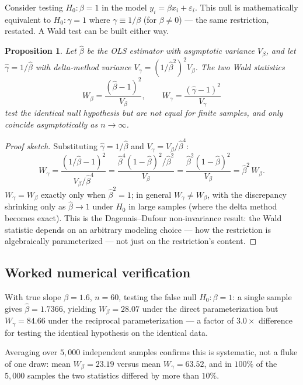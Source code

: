 \documentclass[10pt,journal,compsoc]{IEEEtran}
\newtheorem{proposition}{Proposition}
\begin{document}
Consider testing $H_0:\beta=1$ in the model $y_i=\beta x_i+\varepsilon_i$. This null is mathematically equivalent to $H_0:\gamma=1$ where $\gamma \equiv 1/\beta$ (for $\beta\ne 0$) — the same restriction, restated. A Wald test can be built either way.

\begin{proposition}
Let $\hat\beta$ be the OLS estimator with asymptotic variance $V_\beta$, and let $\hat\gamma = 1/\hat\beta$ with delta-method variance $V_\gamma = (1/\hat\beta^2)^2 V_\beta$. The two Wald statistics
\begin{equation}
    W_\beta = \frac{(\hat\beta-1)^2}{V_\beta}, \qquad W_\gamma = \frac{(\hat\gamma-1)^2}{V_\gamma}
\end{equation}
test the identical null hypothesis but are not equal for finite samples, and only coincide asymptotically as $n\to\infty$.
\end{proposition}
\begin{proof}[Proof sketch]
Substituting $\hat\gamma=1/\hat\beta$ and $V_\gamma=V_\beta/\hat\beta^4$:
\begin{equation}
    W_\gamma = \frac{(1/\hat\beta - 1)^2}{V_\beta/\hat\beta^4} = \frac{\hat\beta^4(1-\hat\beta)^2/\hat\beta^2}{V_\beta} = \frac{\hat\beta^2(1-\hat\beta)^2}{V_\beta} = \hat\beta^2\, W_\beta.
\end{equation}
$W_\gamma = W_\beta$ exactly only when $\hat\beta^2=1$; in general $W_\gamma \ne W_\beta$, with the discrepancy shrinking only as $\hat\beta\to 1$ under $H_0$ in large samples (where the delta method becomes exact). This is the Dagenais--Dufour non-invariance result: the Wald statistic depends on an arbitrary modeling choice — how the restriction is algebraically parameterized — not just on the restriction's content.
\end{proof}

\subsection{Worked numerical verification}
With true slope $\beta=1.6$, $n=60$, testing the false null $H_0:\beta=1$: a single sample gives $\hat\beta=1.7366$, yielding $W_\beta=28.07$ under the direct parameterization but $W_\gamma=84.66$ under the reciprocal parameterization — a factor of $3.0\times$ difference for testing the identical hypothesis on the identical data.

Averaging over $5{,}000$ independent samples confirms this is systematic, not a fluke of one draw: mean $W_\beta=23.19$ versus mean $W_\gamma=63.52$, and in $100\%$ of the $5{,}000$ samples the two statistics differed by more than $10\%$.
\end{document}
